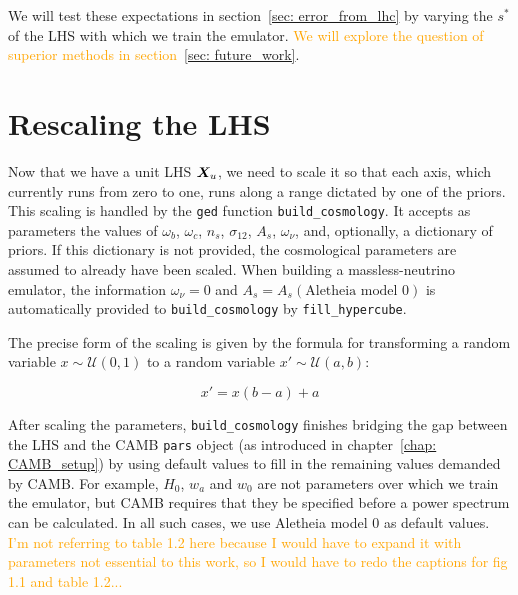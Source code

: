 
We will test these expectations in section~\ref{sec: error_from_lhc} by
varying the $s^*$ of the LHS with which we train the emulator.
\textcolor{orange}{We will explore the question of superior methods in
section~\ref{sec: future_work}}.

\section{Rescaling the LHS}
\label{sec: lhc_rescale}


Now that we have a unit LHS $\bm{X}_u$, we need to scale it 
so that each axis, which currently runs from zero to one, runs along a range 
dictated by one of the priors. This scaling is handled by the \texttt{ged}
function \verb|build_cosmology|. It accepts as parameters the values of
$\omega_b$, $\omega_c$, $n_s$, $\sigma_{12}$, $A_s$, $\omega_\nu$, and, 
optionally, a dictionary of priors. If this
dictionary is not provided, the cosmological parameters are assumed to
already have been scaled. When building a massless-neutrino emulator,
the information $\omega_\nu = 0$ and $A_s = A_s(\text{Aletheia model 0})$ is
automatically provided to \verb|build_cosmology| by
\verb|fill_hypercube|. 

The precise form of the scaling is given by the formula for transforming a
random variable $x \sim \mathcal{U}(0, 1)$ to a random variable
$x' \sim \mathcal{U}(a, b)$:

\begin{equation}
\label{eq: scaling}
x' = x (b - a) + a
\end{equation}

After scaling the parameters, \verb|build_cosmology| finishes bridging the gap
between the LHS and the CAMB \verb|pars| object (as introduced in
chapter~\ref{chap: CAMB_setup}) by using default values to fill in the
remaining values demanded by CAMB. For example, $H_0$, $w_a$ and $w_0$ are
not parameters over
which we train the emulator, but CAMB requires that they be specified before
a power spectrum can be calculated. In all such cases, we use Aletheia model
0 as default values. \textcolor{orange}{I'm not referring to table 1.2 here
because I would have to expand it with parameters not essential to this work,
so I would have to redo the captions for fig 1.1 and table 1.2...}

